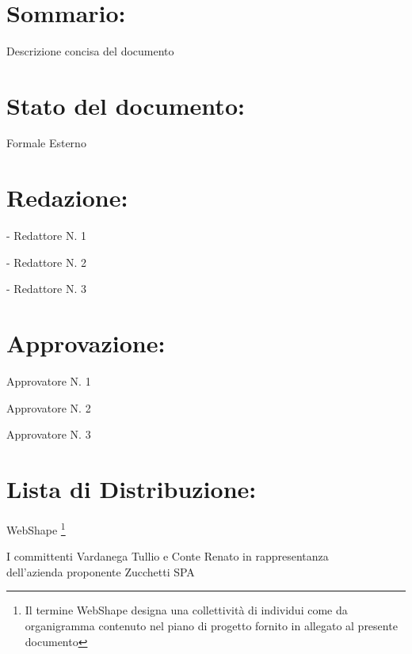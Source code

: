 \begin{center} %
	\begin{Huge}	
				\textbf{\TITOLODOC}
			\\
	\end{Huge}
\end{center}

\section*{\Large Sommario:} %
\indent \indent
Descrizione concisa del documento

\section*{\Large Stato del documento:}
\indent \indent
	Formale Esterno

\section*{\Large Redazione:}
	\begin{elencopuntato}[\normindent]
		\item[-] Redattore N. 1
		\item[-] Redattore N. 2
		\item[-] Redattore N. 3
	\end{elencopuntato}

\section*{\Large Approvazione:}
	\begin{elencopuntato}[\normindent]
		\item Approvatore N. 1
		\item Approvatore N. 2
		\item Approvatore N. 3
	\end{elencopuntato}

\section*{\LARGE Lista di Distribuzione:}

	\begin{elenconumerato}{\normindent}
		\item WebShape \footnote{Il termine WebShape designa una collettivit\`a di individui come da organigramma contenuto nel piano di progetto fornito in allegato al presente documento}
		\item I committenti Vardanega Tullio e Conte Renato in rappresentanza \\  dell'azienda proponente Zucchetti SPA
	\end{elenconumerato}


